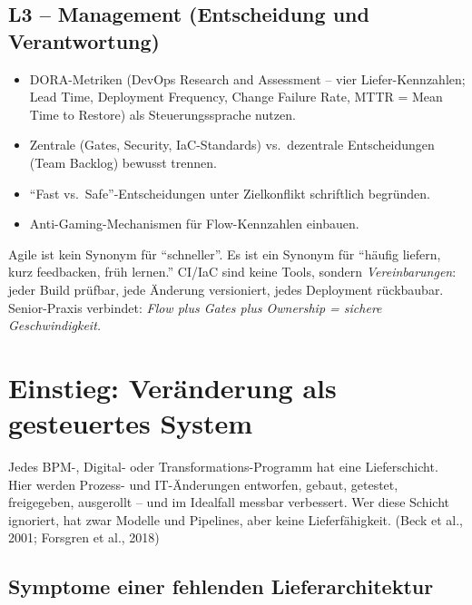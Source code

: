 \documentclass[11pt,a4paper,oneside]{article}
\newcommand{\quelle}[1]{{\footnotesize\color{lpGray}(#1)}}
\begin{document}
\subsection*{L3 -- Management (Entscheidung und Verantwortung)}
\begin{itemize}
  \item DORA-Metriken (DevOps Research and Assessment -- vier Liefer-Kennzahlen; Lead Time, Deployment Frequency, Change Failure Rate, MTTR = Mean Time to Restore) als Steuerungssprache nutzen.
  \item Zentrale (Gates, Security, IaC-Standards) vs.\ dezentrale Entscheidungen (Team Backlog) bewusst trennen.
  \item ``Fast vs.\ Safe''-Entscheidungen unter Zielkonflikt schriftlich begründen.
  \item Anti-Gaming-Mechanismen für Flow-Kennzahlen einbauen.
\end{itemize}

\begin{merkbox}
Agile ist kein Synonym für ``schneller''. Es ist ein Synonym für ``häufig liefern, kurz feedbacken, früh lernen.'' CI/IaC sind keine Tools, sondern \emph{Vereinbarungen}: jeder Build prüfbar, jede Änderung versioniert, jedes Deployment rückbaubar. Senior-Praxis verbindet: \emph{Flow plus Gates plus Ownership = sichere Geschwindigkeit.}
\end{merkbox}

\clearpage

\section{Einstieg: Veränderung als gesteuertes System}

Jedes BPM-, Digital- oder Transformations-Programm hat eine Lieferschicht. Hier werden Prozess- und IT-Änderungen entworfen, gebaut, getestet, freigegeben, ausgerollt -- und im Idealfall messbar verbessert. Wer diese Schicht ignoriert, hat zwar Modelle und Pipelines, aber keine Lieferfähigkeit. \quelle{Beck et al., 2001; Forsgren et al., 2018}

\subsection{Symptome einer fehlenden Lieferarchitektur}
\end{document}
